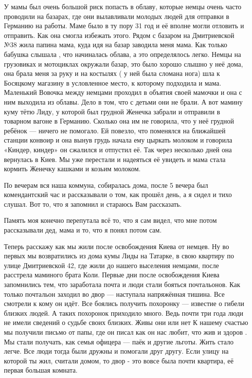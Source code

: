 У мамы был очень большой риск попасть в облаву, которые немцы очень часто
проводили на базарах, где они вылавливали молодых людей для отправки в Германию
на работы. Маме было в ту пору 31 год и её вполне могли отловить и отправить.
Как она смогла избежать этого. Рядом с базаром на Дмитриевской №38 жила папина
мама, куда идя на базар заводила меня мама. Как только бабушка слышала , что
начиналась облава, а это определялось легко. Немцы на грузовиках и мотоциклах
окружали базар, это было хорошо слышно у неё дома, она брала меня за руку и на
костылях ( у ней была сломана нога) шла к Босяцкому магазину в условленное
место, к которому подходила и мама. Маленький Вовочка между немцами проходил в
объятия своей мамочки и она с ним выходила из облавы. Дело в том, что с детьми
они не брали. А вот мамину куму  тётю Лиду, у которой был грудной Женечка
забрали и отправили  в товарном вагоне в Германию. Сколько она им не говорила,
что у неё грудной ребёнок — ничего не помогало.  Ей повезло, что поменялся  на
ближайшей станции конвоир и она вынув грудь  начала ему цыркать  молоком и
говорила «Киндер, киндер» он  сжалился и отпустил её. Так через несколько дней
она вернулась в Киев.   Мы уже перестали и надеяться её увидеть и мама стала
кормить Женечку кашками и козьим молоком.

По вечерам вся  наша коммуна,  собиралась дома, после 5 вечера был
комендантский час и рассказывали о том, как прошёл день, а я сидел и тихо
слушал. Вот то, что я запомнил и стараюсь Вам рассказать.

Память моя конечно перепутала всё то, что я сам видел, что мне потом
рассказывали дед, мама и то, что я понял потом сам.

Теперь расскажу как мы жили после освобождения Киева от немцев. Ну во первых мы
возвратились из дома кумы Лиды на Татарке,   в свою квартиру по улице
Дмитриевской 42, где жили до нашего выселения немцами, после расстрела маминого
брата Коли.  Первые дни после освобождения Киева запомнились тем, что
заработала почта и люди стали бояться почтальонов. Как только почтальон заходил
во двор — наступала напряжённая тишина. Все смотрели к кому он  идёт. Все
боялись получить похоронку — известие о гибели близких людей. А таких похоронок
приходило много. Ведь почти три года люди не имели сведений о судьбе своих
близких. Живы они или нет К нашему счастью мы получили письмо от папы, где он
писал как он нас любит, что жив и здоров . Мы стали получать, как семья офицера
— паёк и другие льготы. Жить стало легче. Все люди тогда были дружны и помогали
друг другу. Если улицу на которой ты жил, считали домом, то двор  -  это вовсе
была почти квартира, её первая большая комната.


